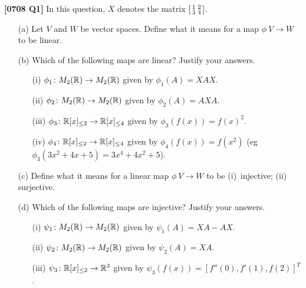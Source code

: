 \documentclass[a4paper]{article}
\begin{document}
\begin{problem}\textbf{[0708 Q1]}
 In this question, $X$ denotes the matrix $\left[\begin{smallmatrix} 1&2\\3&4\end{smallmatrix}\right]$.
 \begin{itemize}
  \item[(a)] Let $V$ and $W$ be vector spaces.  Define what it means
   for a map $\phi\:V\to W$ to be linear. 
  \item[(b)] Which of the following maps are linear? Justify your
   answers. 
   \begin{itemize}
    \item[(i)] $\phi_1\colon M_2({\mathbb{R}})\to M_2({\mathbb{R}})$ given by 
     $\phi_1(A)=XAX$.
    \item[(ii)] $\phi_2\colon M_2({\mathbb{R}})\to M_2({\mathbb{R}})$ given by 
     $\phi_2(A) = AXA$.
    \item[(iii)] $\phi_3\colon{\mathbb{R}}[x]_{\leq 2}\to{\mathbb{R}}[x]_{\leq 4}$ given by
     $\phi_3(f(x))=f(x)^2$.
    \item[(iv)] $\phi_4\colon{\mathbb{R}}[x]_{\leq 2}\to{\mathbb{R}}[x]_{\leq 4}$ given by
     $\phi_4(f(x))=f(x^2)$ (eg $\phi_3(3x^2+4x+5)=3x^4+4x^2+5$).
   \end{itemize}
  \item[(c)] Define what it means for a linear map $\phi\:V\to W$ to
   be (i)~injective; (ii) surjective.  
  \item[(d)] Which of the following maps are injective? Justify your
   answers. 
   \begin{itemize}
    \item[(i)] $\psi_1\colon M_2({\mathbb{R}})\to M_2({\mathbb{R}})$ given by 
     $\psi_1(A)=XA-AX$.
    \item[(ii)] $\psi_2\colon M_2({\mathbb{R}})\to M_2({\mathbb{R}})$ given by 
     $\psi_2(A)=XA$.
    \item[(iii)] $\psi_3\colon{\mathbb{R}}[x]_{\leq 2}\to{\mathbb{R}}^3$ given by
     $\psi_3(f(x))=[f''(0),f'(1),f(2)]^T$. 
   \end{itemize}
 \end{itemize}
\end{problem}
\end{document}
